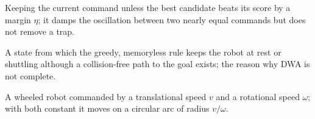\item[Hysteresis (DWA)] Keeping the current command unless the best candidate beats its score by a margin $\eta$; it damps the oscillation between two nearly equal commands but does not remove a trap.
\item[Local minimum (DWA)] A state from which the greedy, memoryless rule keeps the robot at rest or shuttling although a collision-free path to the goal exists; the reason why DWA is not complete.
\item[Differential drive] A wheeled robot commanded by a translational speed $v$ and a rotational speed $\omega$; with both constant it moves on a circular arc of radius $v/\omega$.
